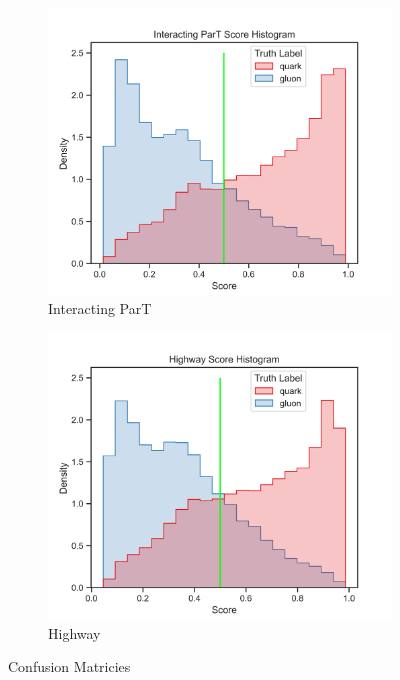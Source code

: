 \begin{figure}[!htb]
	\begin{subfigure}[t]{0.49\textwidth}
		\includegraphics[width=1\textwidth]{src/plots/results/score/interacting_part.png}
		\caption{Interacting ParT}
		\label{fig:app_score_interacting_part}
	\end{subfigure}
	\begin{subfigure}[t]{0.49\textwidth}
		\includegraphics[width=1\textwidth]{src/plots/results/score/highway.png}
		\caption{Highway}
		\label{fig:app_score_highway}
	\end{subfigure}
\caption{Confusion Matricies}
\label{fig:app_score_-1-3}
\end{figure}

